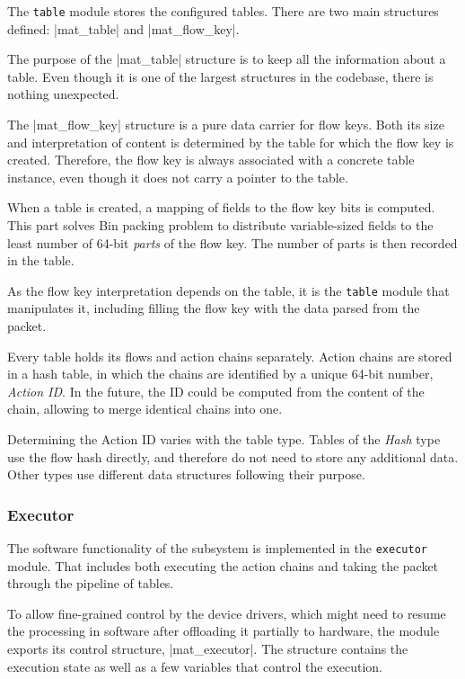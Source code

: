 The \texttt{table} module stores the configured tables. There are two main
structures defined: \struct|mat_table| and \struct|mat_flow_key|.

The purpose of the \struct|mat_table| structure is to keep all the information
about a table. Even though it is one of the largest structures in the codebase,
there is nothing unexpected.

The \struct|mat_flow_key| structure is a pure data carrier for flow keys. Both
its size and interpretation of content is determined by the table for which the
flow key is created. Therefore, the flow key is always associated with
a concrete table instance, even though it does not carry a pointer to the table.

When a table is created, a mapping of fields to the flow key bits is computed.
This part solves Bin packing problem to distribute variable-sized fields to
the least number of 64-bit \emph{parts} of the flow key. The number of parts is
then recorded in the table.

As the flow key interpretation depends on the table, it is the \texttt{table}
module that manipulates it, including filling the flow key with the data parsed
from the packet.

Every table holds its flows and action chains separately. Action chains are
stored in a hash table, in which the chains are identified by a unique 64-bit
number, \emph{Action ID}. In the future, the ID could be computed from the
content of the chain, allowing to merge identical chains into one.

Determining the Action ID varies with the table type. Tables of the \emph{Hash}
type use the flow hash directly, and therefore do not need to store any additional
data. Other types use different data structures following their purpose.

\subsubsection{Executor}

The software functionality of the subsystem is implemented in the
\texttt{executor} module. That includes both executing the action chains and
taking the packet through the pipeline of tables.

To allow fine-grained control by the device drivers, which might need to
resume the processing in software after offloading it partially to hardware,
the module exports its control
structure, \struct|mat_executor|. The structure contains the execution state
as well as a few variables that control the execution.


